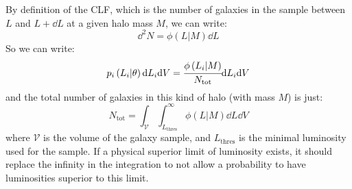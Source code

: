 By definition of the CLF, which is the number of galaxies in the sample between
$L$ and $L+\dd L$ at a given halo mass $M$, we can write:
%
\begin{equation}
    \dd^2 N=\phi\left(L|M\right)\dd L
\end{equation}
%
So we can write:
%
\begin{equation}
    p_i\left(L_i|\theta\right){\rm{d}} L_i{\rm{d}} V =
    \cfrac{\phi\left(L_i|M\right)}{N_\mathrm{tot}}{\rm{d}} L_i{\rm{d}} V
\end{equation}
%
and the total number of galaxies in this kind of halo (with mass $M$) is just:
%
\begin{equation}
    N_\mathrm{tot}=\int_\mathcal{V}\int_{L_\mathrm{thres}}^\infty
    \phi\left(L|M\right)\dd L\dd V
\end{equation}
%
where $\mathcal{V}$ is the volume of the galaxy sample, and $L_\mathrm{thres}$
is the minimal luminosity used for the sample. If a physical superior limit of
luminosity exists, it should replace the infinity in the integration to not
allow a probability to have luminosities superior to this limit.

